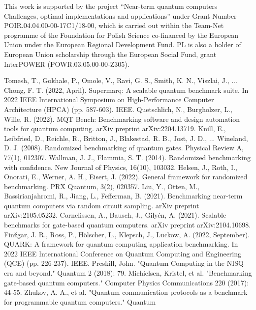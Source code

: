 \documentclass[preprint,12pt, a4paper, dvipsnames]{elsarticle}
\newcommand{\1}{{\rm 1\hspace{-0.9mm}l}}
\begin{document}
This work is  supported by
the project “Near-term quantum computers Challenges, optimal implementations and applications” under Grant Number POIR.04.04.00-00-17C1/18-00, which is carried out within the Team-Net programme of the Foundation for Polish Science co-financed by the European Union under the European Regional Development Fund.
PL is also a holder of European Union scholarship through the European Social Fund,
grant InterPOWER (POWR.03.05.00-00-Z305).


\begin{thebibliography}{00}
	 Tomesh, T., Gokhale, P., Omole, V., Ravi, G. S., Smith, K. N., Viszlai, J., ...  Chong, F. T. (2022, April). Supermarq: A scalable quantum benchmark suite. In 2022 IEEE International Symposium on High-Performance Computer Architecture (HPCA) (pp. 587-603). IEEE.
	 Quetschlich, N., Burgholzer, L., Wille, R. (2022). MQT Bench: Benchmarking software and design automation tools for quantum computing. arXiv preprint arXiv:2204.13719.
	 Knill, E., Leibfried, D., Reichle, R., Britton, J., Blakestad, R. B., Jost, J. D., ... Wineland, D. J. (2008). Randomized benchmarking of quantum gates. Physical Review A, 77(1), 012307.
	 Wallman, J. J.,  Flammia, S. T. (2014). Randomized benchmarking with confidence. New Journal of Physics, 16(10), 103032.
	 Helsen, J., Roth, I., Onorati, E., Werner, A. H.,  Eisert, J. (2022). General framework for randomized benchmarking. PRX Quantum, 3(2), 020357.
  	Liu, Y., Otten, M., Bassirianjahromi, R., Jiang, L.,  Fefferman, B. (2021). Benchmarking near-term quantum computers via random circuit sampling. arXiv preprint arXiv:2105.05232.
 Cornelissen, A., Bausch, J.,  Gilyén, A. (2021). Scalable benchmarks for gate-based quantum computers. arXiv preprint arXiv:2104.10698.
 Finžgar, J. R., Ross, P., Hölscher, L., Klepsch, J.,  Luckow, A. (2022, September). QUARK: A framework for quantum computing application benchmarking. In 2022 IEEE International Conference on Quantum Computing and Engineering (QCE) (pp. 226-237). IEEE.
 Preskill, John. "Quantum Computing in the NISQ era and
beyond." Quantum 2 (2018): 79.
 Michielsen, Kristel, et al. "Benchmarking
gate-based quantum computers." Computer Physics Communications 220 (2017):
44-55.
 Zhukov, A. A., et al. "Quantum communication
protocols as a benchmark for programmable quantum computers." Quantum

\end{thebibliography}
\end{document}
